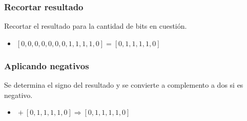 \documentclass{beamer}
\begin{document}
\begin{frame}
\frametitle{Recortar resultado}
Recortar el resultado para la cantidad de bits en cuestión.
\begin{itemize}
\item $[0, 0, 0, 0, 0, 0, 0, 1, 1, 1, 1, 0] = [0, 1, 1, 1, 1, 0]$
\end{itemize}
\end{frame}
\begin{frame}
\frametitle{Aplicando negativos}
Se determina el signo del resultado y se convierte a complemento a dos si es negativo.
\begin{itemize}
\item $\text{} + [0, 1, 1, 1, 1, 0] \Longrightarrow [0, 1, 1, 1, 1, 0]$
\end{itemize}
\end{frame}

\begin{frame}
\maketitle
{}
\end{frame}
\end{document}
